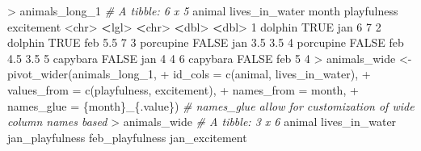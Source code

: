 \documentclass[
]{book}
\newenvironment{Shaded}{\begin{snugshade}}{\end{snugshade}}
\newcommand{\AttributeTok}[1]{\textcolor[rgb]{0.77,0.63,0.00}{#1}}
\newcommand{\CommentTok}[1]{\textcolor[rgb]{0.56,0.35,0.01}{\textit{#1}}}
\newcommand{\ConstantTok}[1]{\textcolor[rgb]{0.00,0.00,0.00}{#1}}
\newcommand{\DecValTok}[1]{\textcolor[rgb]{0.00,0.00,0.81}{#1}}
\newcommand{\ErrorTok}[1]{\textcolor[rgb]{0.64,0.00,0.00}{\textbf{#1}}}
\newcommand{\FloatTok}[1]{\textcolor[rgb]{0.00,0.00,0.81}{#1}}
\newcommand{\FunctionTok}[1]{\textcolor[rgb]{0.00,0.00,0.00}{#1}}
\newcommand{\NormalTok}[1]{#1}
\newcommand{\OtherTok}[1]{\textcolor[rgb]{0.56,0.35,0.01}{#1}}
\newcommand{\SpecialCharTok}[1]{\textcolor[rgb]{0.00,0.00,0.00}{#1}}
\newcommand{\StringTok}[1]{\textcolor[rgb]{0.31,0.60,0.02}{#1}}
\begin{document}
\begin{Shaded}
\begin{Highlighting}[]
\SpecialCharTok{\textgreater{}}\NormalTok{ animals\_long\_1}
\CommentTok{\# A tibble: 6 x 5}
\NormalTok{  animal    lives\_in\_water month playfulness excitement}
  \SpecialCharTok{\textless{}}\NormalTok{chr}\SpecialCharTok{\textgreater{}}     \ErrorTok{\textless{}}\NormalTok{lgl}\SpecialCharTok{\textgreater{}}          \ErrorTok{\textless{}}\NormalTok{chr}\SpecialCharTok{\textgreater{}}       \ErrorTok{\textless{}}\NormalTok{dbl}\SpecialCharTok{\textgreater{}}      \ErrorTok{\textless{}}\NormalTok{dbl}\SpecialCharTok{\textgreater{}}
\DecValTok{1}\NormalTok{ dolphin   }\ConstantTok{TRUE}\NormalTok{           jan           }\DecValTok{6}          \DecValTok{7}  
\DecValTok{2}\NormalTok{ dolphin   }\ConstantTok{TRUE}\NormalTok{           feb           }\FloatTok{5.5}        \DecValTok{7}  
\DecValTok{3}\NormalTok{ porcupine }\ConstantTok{FALSE}\NormalTok{          jan           }\FloatTok{3.5}        \FloatTok{3.5}
\DecValTok{4}\NormalTok{ porcupine }\ConstantTok{FALSE}\NormalTok{          feb           }\FloatTok{4.5}        \FloatTok{3.5}
\DecValTok{5}\NormalTok{ capybara  }\ConstantTok{FALSE}\NormalTok{          jan           }\DecValTok{4}          \DecValTok{4}  
\DecValTok{6}\NormalTok{ capybara  }\ConstantTok{FALSE}\NormalTok{          feb           }\DecValTok{5}          \DecValTok{4}  
\SpecialCharTok{\textgreater{}}\NormalTok{ animals\_wide }\OtherTok{\textless{}{-}} \FunctionTok{pivot\_wider}\NormalTok{(animals\_long\_1,}
\SpecialCharTok{+}                             \AttributeTok{id\_cols =} \FunctionTok{c}\NormalTok{(}\StringTok{\textquotesingle{}animal\textquotesingle{}}\NormalTok{, }\StringTok{\textquotesingle{}lives\_in\_water\textquotesingle{}}\NormalTok{),}
\SpecialCharTok{+}                             \AttributeTok{values\_from =} \FunctionTok{c}\NormalTok{(}\StringTok{\textquotesingle{}playfulness\textquotesingle{}}\NormalTok{, }\StringTok{\textquotesingle{}excitement\textquotesingle{}}\NormalTok{),}
\SpecialCharTok{+}                             \AttributeTok{names\_from =} \StringTok{\textquotesingle{}month\textquotesingle{}}\NormalTok{,}
\SpecialCharTok{+}                             \AttributeTok{names\_glue =} \StringTok{\textquotesingle{}\{month\}\_\{.value\}\textquotesingle{}}\NormalTok{) }\CommentTok{\# \textasciigrave{}names\_glue\textasciigrave{} allow for customization of wide column names based}
\SpecialCharTok{\textgreater{}}\NormalTok{ animals\_wide}
\CommentTok{\# A tibble: 3 x 6}
\NormalTok{  animal    lives\_in\_water jan\_playfulness feb\_playfulness jan\_excitement}

\end{Highlighting}
\end{Shaded}
\end{document}
